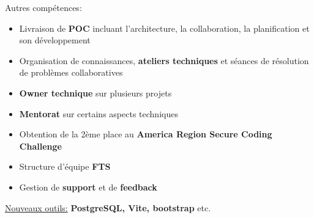 \documentclass[10pt,a4paper,ragged2e,withhyper]{altacv}
\begin{document}
Autres compétences:
\begin{itemize}
  \item Livraison de \textbf{POC} incluant l'architecture, la collaboration, la planification et son développement
  \item Organisation de connaissances, \textbf{ateliers techniques} et séances de résolution de problèmes collaboratives
  \item \textbf{Owner technique} sur plusieurs projets
  \item \textbf{Mentorat} sur certains aspects techniques
  \item Obtention de la 2ème place au \textbf{America Region Secure Coding Challenge}
  \item Structure d'équipe \textbf{FTS}
  \item Gestion de \textbf{support} et de \textbf{feedback}
\end{itemize}
\begin{itshape}
  \underline{Nouveaux outils:}
  \small{\textbf{PostgreSQL, Vite, bootstrap} etc.}
\end{itshape}

\divider
\end{document}
